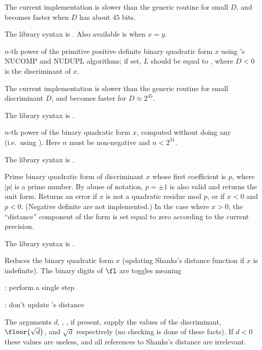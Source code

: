 The current implementation is slower than the generic routine for small $D$,
and becomes faster when $D$ has about $45$ bits.

The library syntax is .
Also available is  when $x=y$.

\label{se:qfbnupow}
$n$-th power of the primitive positive definite
binary quadratic form $x$ using 's NUCOMP and NUDUPL algorithms;
if set, $L$ should be equal to , where $D < 0$ is
the discriminant of $x$.

The current implementation is slower than the generic routine for small
discriminant $D$, and becomes faster for $D \approx 2^{45}$.

The library syntax is .

\label{se:qfbpowraw}
$n$-th power of the binary quadratic form
$x$, computed without doing any  (i.e.~using ).
Here $n$ must be non-negative and $n<2^{31}$.

The library syntax is .

\label{se:qfbprimeform}
Prime binary quadratic form of discriminant
$x$ whose first coefficient is $p$, where $|p|$ is a prime number.
By abuse of notation,
$p = \pm 1$ is also valid and returns the unit form. Returns an
error if $x$ is not a quadratic residue mod $p$, or if $x < 0$ and $p < 0$.
(Negative definite  are not implemented.) In the case where $x>0$,
the ``distance'' component of the form is set equal to zero according to the
current precision.

The library syntax is .

\label{se:qfbred}
Reduces the binary quadratic form $x$ (updating Shanks's distance function
if $x$ is indefinite). The binary digits of $\fl$ are toggles meaning

: perform a single  step

: don't update 's distance

The arguments $d$, , , if present, supply the values of the
discriminant, $\floor{\sqrt{d}}$, and $\sqrt{d}$ respectively
(no checking is done of these facts). If $d<0$ these values are useless,
and all references to Shanks's distance are irrelevant.

